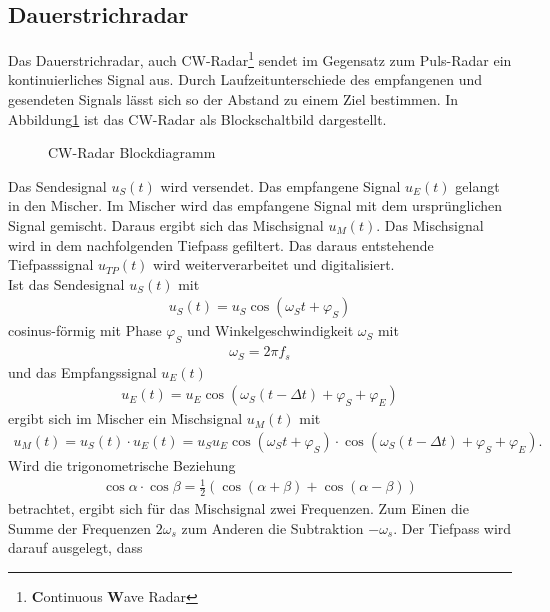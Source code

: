 \subsection{Dauerstrichradar}
Das Dauerstrichradar, auch CW-Radar\footnote{\textbf{C}ontinuous  \textbf{W}ave Radar} sendet im Gegensatz zum Puls-Radar ein kontinuierliches Signal aus. Durch Laufzeitunterschiede des empfangenen und gesendeten Signals lässt sich so der Abstand zu einem Ziel bestimmen. In Abbildung\ref{fig:cwradar} ist das CW-Radar als Blockschaltbild dargestellt.
\begin{figure}[tbp]
  \centering
  
  \caption{CW-Radar Blockdiagramm}
  \label{fig:cwradar}
\end{figure}
Das Sendesignal $u_{S}(t)$ wird versendet. Das empfangene Signal $u_{E}(t)$ gelangt in den Mischer. Im Mischer wird das empfangene Signal mit dem ursprünglichen Signal gemischt. Daraus ergibt sich das Mischsignal $u_{M}(t)$. Das Mischsignal wird in dem nachfolgenden Tiefpass gefiltert. Das daraus entstehende Tiefpasssignal $u_{TP}(t)$ wird weiterverarbeitet und digitalisiert. \\
Ist das Sendesignal $u_{S}(t)$ mit
\begin{align}
u_{S}(t) =  u_{S} \cos\left( \omega_{S}t + \varphi_{S}\right)
\end{align} 
cosinus-förmig mit Phase $\varphi_{S}$ und Winkelgeschwindigkeit $\omega_{S}$ mit 
\begin{align}
\omega_{S} = 2 \pi f_{s}
\end{align}
und das Empfangssignal  $u_{E}(t)$ 
\begin{align}
u_{E}(t) =  u_{E} \cos\left( \omega_{S}\left(t-\Delta t\right) + \varphi_{S}+\varphi_{E}\right) 
\end{align}
ergibt sich im Mischer ein Mischsignal $u_{M}(t)$ mit
\begin{align}
u_{M}(t) = u_{S}(t)\cdot u_{E}(t) = u_{S} u_{E} \cos\left( \omega_{S}t + \varphi_{S}\right)\cdot \cos\left( \omega_{S}\left(t-\Delta t\right) + \varphi_{S}+\varphi_{E}\right).
\end{align}
Wird die trigonometrische Beziehung 
\begin{align}
\cos \alpha \cdot \cos \beta = \frac{1}{2} \left( \cos \left( \alpha + \beta \right) + \cos \left( \alpha - \beta \right) \right)
\end{align}
betrachtet, ergibt sich für das Mischsignal zwei Frequenzen. Zum Einen die Summe der Frequenzen $2\omega_{s}$ zum Anderen die Subtraktion $-\omega_{s}$. Der Tiefpass wird darauf ausgelegt, dass 
